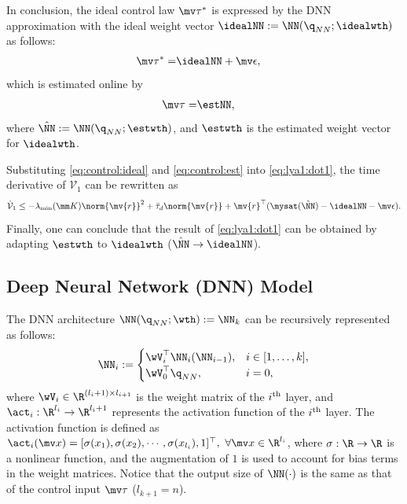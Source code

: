 \documentclass[lettersize,journal]{IEEEtran}
\newcommand*{\fe}{\mv{r}}
\begin{document}
In conclusion, the ideal control law $\mv\tau^*$ is expressed by the DNN approximation with the ideal weight vector $\idealNN:=\NN(\q_{NN};\idealwth)$ as follows:
\begin{align}
    \mv\tau^*=& \idealNN+\mv\epsilon,
    \label{eq:control:ideal}
\end{align}
which is estimated online by
\begin{align}
    \mv\tau =& \estNN,
    \label{eq:control:est}
\end{align}
where $\hat\NN:=\NN(\q_{NN};\estwth)$, and  $\estwth$ is the estimated weight vector for $\idealwth$.

Substituting \eqref{eq:control:ideal} and \eqref{eq:control:est} into \eqref{eq:lya1:dot1}, the time derivative of $\mathcal V_1$ can be rewritten as
\begin{equation}
    \dot{\mathcal V}_1
    \le 
    -\lambda_{\min}(\mm K)\norm{\fe}^2
    +
    \bar\tau_d\norm{\fe}
    +
    \fe^\top (\mysat(\hat\NN)-\idealNN-\mv\epsilon)
    .
    \label{eq:lya1:dot2}
\end{equation}
Finally, one can conclude that the result of \eqref{eq:lya1:dot1} can be obtained by adapting $\estwth$ to $\idealwth$ (\ie $\hat\NN\to\idealNN$).

\subsection{Deep Neural Network (DNN) Model}\label{sec:sub:NN definition}

The DNN architecture $\NN(\q_{NN};\wth) := \NN_k$ can be recursively represented as follows:
\begin{equation}
    \NN_i :=
    \begin{cases}
        \wV_i^\top \NN_i(\NN_{i-1}), 
        &
        i\in[1,\dots,k],
        \\
        \wV_0^\top \q_{NN},
        &
        i=0
        ,
    \end{cases}
    \label{eq:DNN:architecture}
\end{equation}
where $\wV_i\in\R^{(l_i+1)\times l_{i+1}}$ is the weight matrix of the $i\textsuperscript{th}$ layer, and $\act_i: \R^{l_i}\to\R^{l_i+1}$ represents the activation function of the $i\textsuperscript{th}$ layer. 
The activation function is defined as $\act_i(\mv x)=[\sigma(x_1),\sigma(x_2),\cdots, \sigma(x_{l_{i}}), 1]^\top,\ \forall\mv x\in\R^{l_i}$, where $\sigma: \R\to\R$ is a nonlinear function, and the augmentation of $1$ is used to account for bias terms in the weight matrices. 
Notice that the output size of $\NN(\cdot)$ is the same as that of the control input $\mv\tau$ (\ie $l_{k+1}=n$). 
\end{document}
